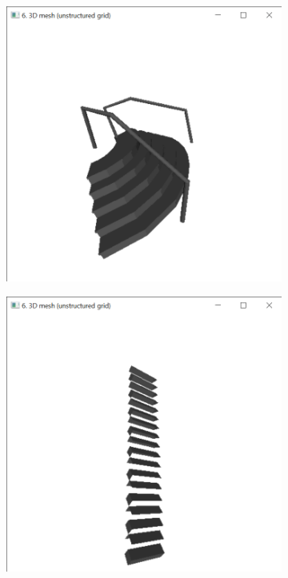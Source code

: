 \documentclass{bigdata}
\begin{document}
\begin{figure}[h!]
	\centering
	\begin{subfigure}[b]{0.2\linewidth}
		\includegraphics[width=\linewidth]{Pictures/Evaluation/staircaseClass/stair1.png}
	\end{subfigure}
	\begin{subfigure}[b]{0.2\linewidth}
		\includegraphics[width=\linewidth]{Pictures/Evaluation/staircaseClass/stair2.png}

\end{subfigure}
\end{figure}
\end{document}
